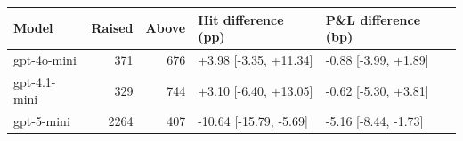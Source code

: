 \begin{tabular}{lrrll}
\toprule
Model & Raised & Above & Hit difference (pp) & P\&L difference (bp) \\
\midrule
gpt-4o-mini & 371 & 676 & +3.98 [-3.35, +11.34] & -0.88 [-3.99, +1.89] \\
gpt-4.1-mini & 329 & 744 & +3.10 [-6.40, +13.05] & -0.62 [-5.30, +3.81] \\
gpt-5-mini & 2264 & 407 & -10.64 [-15.79, -5.69] & -5.16 [-8.44, -1.73] \\
\bottomrule
\end{tabular}
